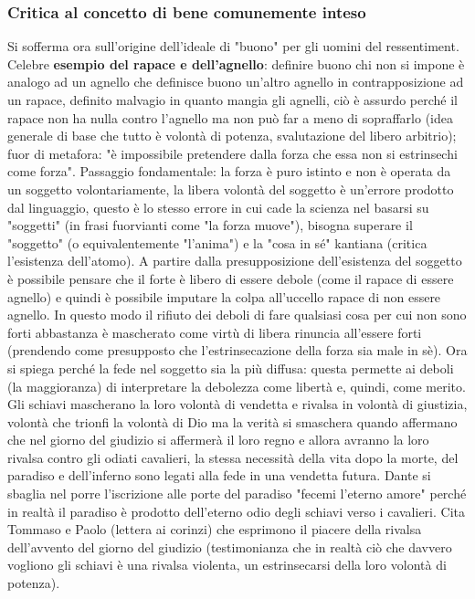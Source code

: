 \documentclass[10pt,a4paper]{article}
\begin{document}
\subsubsection{Critica al concetto di bene comunemente inteso}
Si sofferma ora sull'origine dell'ideale di "buono" per gli uomini del ressentiment. Celebre \textbf{esempio del rapace e dell'agnello}: definire buono chi non si impone è analogo ad un agnello che definisce buono un'altro agnello in contrapposizione ad un rapace, definito malvagio in quanto mangia gli agnelli, ciò è assurdo perché il rapace non ha nulla contro l'agnello ma non può far a meno di sopraffarlo (idea generale di base che tutto è volontà di potenza, svalutazione del libero arbitrio); fuor di metafora: "è impossibile pretendere dalla forza che essa non si estrinsechi come forza". Passaggio fondamentale: la forza è puro istinto e non è operata da un soggetto volontariamente, la libera volontà del soggetto è un'errore prodotto dal linguaggio, questo è lo stesso errore in cui cade la scienza nel basarsi su "soggetti" (in frasi fuorvianti come "la forza muove"), bisogna superare il "soggetto" (o equivalentemente "l'anima") e la "cosa in sé" kantiana (critica l'esistenza dell'atomo). A partire dalla presupposizione dell'esistenza del soggetto è possibile pensare che il forte è libero di essere debole (come il rapace di essere agnello) e quindi è possibile imputare la colpa all'uccello rapace di non essere agnello. In questo modo il rifiuto dei deboli di fare qualsiasi cosa per cui non sono forti abbastanza è mascherato come virtù di libera rinuncia all'essere forti (prendendo come presupposto che l'estrinsecazione della forza sia male in sè). Ora si spiega perché la fede nel soggetto sia la più diffusa: questa permette ai deboli (la maggioranza) di interpretare la debolezza come libertà e, quindi, come merito.\\
Gli schiavi mascherano la loro volontà di vendetta e rivalsa in volontà di giustizia, volontà che trionfi la volontà di Dio ma la verità si smaschera quando affermano che nel giorno del giudizio si affermerà il loro regno e allora avranno la loro rivalsa contro gli odiati cavalieri, la stessa necessità della vita dopo la morte, del paradiso e dell'inferno sono legati alla fede in una vendetta futura. Dante si sbaglia nel porre l'iscrizione alle porte del paradiso "fecemi l'eterno amore" perché in realtà il paradiso è prodotto dell'eterno odio degli schiavi verso i cavalieri. Cita Tommaso e Paolo (lettera ai corinzi) che esprimono il piacere della rivalsa dell'avvento del giorno del giudizio (testimonianza che in realtà ciò che davvero vogliono gli schiavi è una rivalsa violenta, un estrinsecarsi della loro volontà di potenza).\\
\end{document}
